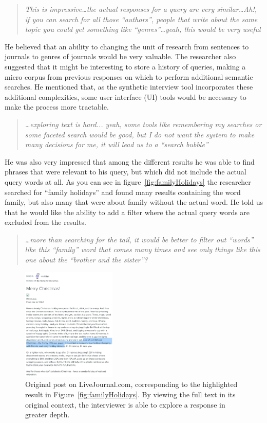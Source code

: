\documentclass{sigchi}
\begin{document}
\begin{quote}
{\em
This is impressive\dots the actual responses for a query are very similar\dots Ah!, if you can search for all those ``authors'', people that write about the same topic you could get something like ``genres''\dots yeah, this would be very useful
}\end{quote}

He believed that an ability to changing the unit of research from sentences to journals to genres of journals would be very valuable. The researcher also suggested that it might be interesting to store a history of queries, making a micro corpus from previous responses on which to perform additional semantic searches. He mentioned that, as the synthetic interview tool incorporates these additional complexities, some user interface (UI) tools would be necessary to make the process more tractable. 

\begin{quote}
{\em
\dots exploring text is hard... yeah, some tools like remembering my searches or some faceted search would be good, but I do not want the system to make many decisions for me, it will lead us to a ``search bubble''
}\end{quote}

He was also very impressed that among the different results he was able to find phrases that were relevant to his query, but which did not include the actual query words at all. As you can see in figure~\ref{fig:familyHolidays} the researcher searched for ``family holidays'' and found many results containing the word family, but also many that were about family without the actual word. He told us that he would like the ability to add a filter where the actual query words are excluded from the results.

\begin{quote}
{\em
\dots more than searching for the tail, it would be better to filter out ``words'' like this ``family'' word that comes many times and see only things like this one about the ``brother and the sister''?
}\end{quote}

\begin{figure}[bt]
\centering \includegraphics[width=0.4\textwidth]{figures/examplePost2} 
\caption{Original post on LiveJournal.com, corresponding to the highlighted result in Figure~\ref{fig:familyHolidays}. By viewing the full text in its original context, the interviewer is able to explore a response in greater depth. \label{fig:examplePost}}
\end{figure}
\end{document}
